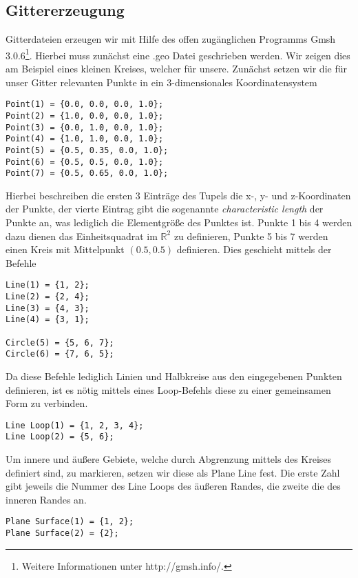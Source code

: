 \subsection{Gittererzeugung}
\label{meshgeneration}
Gitterdateien erzeugen wir mit Hilfe des offen zugänglichen Programms \textsf{Gmsh 3.0.6}\footnote{Weitere Informationen unter http://gmsh.info/.}. Hierbei muss  zunächst eine \textsf{.geo} Datei geschrieben werden. Wir zeigen dies am Beispiel eines kleinen Kreises, welcher für unsere.
Zunächst setzen wir die für unser Gitter relevanten Punkte in ein 3-dimensionales Koordinatensystem

\begin{lstlisting}
Point(1) = {0.0, 0.0, 0.0, 1.0};
Point(2) = {1.0, 0.0, 0.0, 1.0};
Point(3) = {0.0, 1.0, 0.0, 1.0};
Point(4) = {1.0, 1.0, 0.0, 1.0};
Point(5) = {0.5, 0.35, 0.0, 1.0};
Point(6) = {0.5, 0.5, 0.0, 1.0};
Point(7) = {0.5, 0.65, 0.0, 1.0};
\end{lstlisting}

Hierbei beschreiben die ersten 3 Einträge des Tupels die x-, y- und z-Koordinaten der Punkte, der vierte Eintrag gibt die sogenannte \textit{characteristic length} der Punkte an, was lediglich die Elementgröße des Punktes ist. Punkte 1 bis 4 werden dazu dienen das Einheitsquadrat im $\mathbb{R}^2$ zu definieren, Punkte 5 bis 7 werden einen Kreis mit Mittelpunkt $(0.5,0.5)$ definieren. Dies geschieht mittels der Befehle

\begin{lstlisting}
Line(1) = {1, 2};
Line(2) = {2, 4};
Line(3) = {4, 3};
Line(4) = {3, 1};

Circle(5) = {5, 6, 7};
Circle(6) = {7, 6, 5};
\end{lstlisting}

Da diese Befehle lediglich Linien und Halbkreise aus den eingegebenen Punkten definieren, ist es nötig mittels eines \textsf{Loop}-Befehls diese zu einer gemeinsamen Form zu verbinden.

\begin{lstlisting}
Line Loop(1) = {1, 2, 3, 4};
Line Loop(2) = {5, 6};
\end{lstlisting}

Um innere und äußere Gebiete, welche durch Abgrenzung mittels des Kreises definiert sind, zu markieren, setzen wir diese als \textsf{Plane Line} fest. Die erste Zahl gibt jeweils die Nummer des \textsf{Line Loops} des äußeren Randes, die zweite die des inneren Randes an.

\begin{lstlisting}
Plane Surface(1) = {1, 2};
Plane Surface(2) = {2};
\end{lstlisting}

